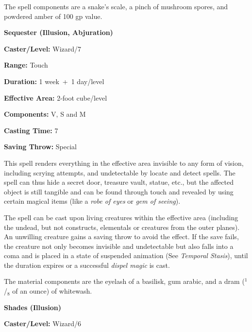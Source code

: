 \begin{multicols}{2}
The spell components are a snake's scale, a pinch of mushroom spores, and powdered amber of 100 gp value.

\vspace{1em}

\noindent
\begin{minipage}{\columnwidth}

\noindent \textbf{Sequester (Illusion, Abjuration)}

\noindent \textbf{Caster/Level:} Wizard/7

\noindent \textbf{Range:} Touch

\noindent \textbf{Duration:} 1 week~+~1 day/level

\noindent \textbf{Effective Area:} 2-foot cube/level

\noindent \textbf{Components:} V, S and M

\noindent \textbf{Casting Time:} 7

\noindent \textbf{Saving Throw:} Special

\end{minipage}

This spell renders everything in the effective area invisible to any form of vision, including scrying attempts, and undetectable by locate and detect spells.  The spell can thus hide a secret door, treasure vault, statue, etc., but the affected object is still tangible and can be found through touch and revealed by using certain magical items (like a \textit{robe of eyes} or \textit{gem of seeing}).  

The spell can be cast upon living creatures within the effective area (including the undead, but not constructs, elementals or creatures from the outer planes).  An unwilling creature gains a saving throw to avoid the effect.  If the save fails, the creature not only becomes invisible and undetectable but also falls into a coma and is placed in a state of suspended animation (See \textit{Temporal Stasis}), until the duration expires or a successful \textit{dispel magic} is cast.    

The material components are the eyelash of a basilisk, gum arabic, and a dram ($^1$/$_8$ of an ounce) of whitewash.

\vspace{1em}

\noindent
\begin{minipage}{\columnwidth}

\noindent \textbf{Shades (Illusion)}

\noindent \textbf{Caster/Level:} Wizard/6


\end{minipage}
\end{multicols}
